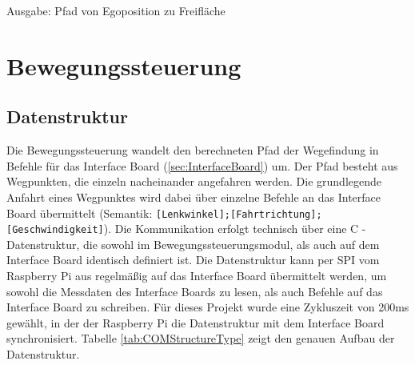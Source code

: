 Ausgabe:
Pfad von Egoposition zu Freifläche





\section{Bewegungssteuerung}
\subsection{Datenstruktur}
Die Bewegungssteuerung wandelt den berechneten Pfad der Wegefindung in Befehle für das Interface Board (\ref{sec:InterfaceBoard}) um. Der Pfad besteht aus Wegpunkten, die einzeln nacheinander angefahren werden. Die grundlegende Anfahrt eines Wegpunktes wird dabei über einzelne Befehle an das Interface Board übermittelt (Semantik: \texttt{[Lenkwinkel];[Fahrtrichtung];[Geschwindigkeit]}). Die Kommunikation erfolgt technisch über eine C - Datenstruktur, die sowohl im Bewegungssteuerungsmodul, als auch auf dem Interface Board identisch definiert ist. Die Datenstruktur kann per SPI vom Raspberry Pi aus regelmäßig auf das Interface Board übermittelt werden, um sowohl die Messdaten des Interface Boards zu lesen, als auch Befehle auf das Interface Board zu schreiben. Für dieses Projekt wurde eine Zykluszeit von 200ms gewählt, in der der Raspberry Pi die Datenstruktur mit dem Interface Board synchronisiert. Tabelle \ref{tab:COMStructureType} zeigt den genauen Aufbau der Datenstruktur.

